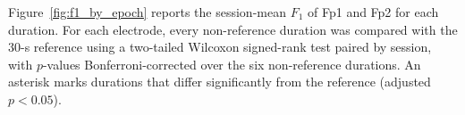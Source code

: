 Figure~\ref{fig:f1_by_epoch} reports the session-mean $F_1$ of Fp1 and Fp2 for each duration. For each electrode, every non-reference duration was compared with the 30-s reference using a two-tailed Wilcoxon signed-rank test paired by session, with $p$-values Bonferroni-corrected over the six non-reference durations. An asterisk marks durations that differ significantly from the reference (adjusted $p < 0.05$).
